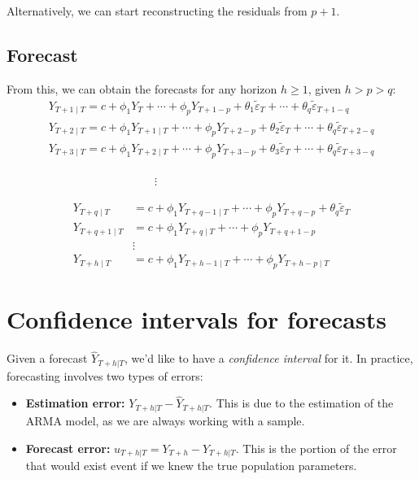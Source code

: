 \documentclass[11pt, a4paper]{report}
\theoremstyle{plain}
\theoremstyle{plain}
\theoremstyle{remark}
\begin{document}
Alternatively, we can start reconstructing the residuals from $p+1$. 

\subsection{Forecast}

From this, we can obtain the forecasts for any horizon $h \geq 1$, given $h>p>q$: 
$$\begin{array}{l}
	Y_{T+1 \mid T}=c+\phi_{1} Y_{T}+\cdots+\phi_{p} Y_{T+1-p}+\theta_{1} \widetilde{\varepsilon}_{T}+\cdots+\theta_{q} \widetilde{\varepsilon}_{T+1-q} \\
	Y_{T+2 \mid T}=c+\phi_{1} Y_{T+1 \mid T}+\cdots+\phi_{p} Y_{T+2-p}+\theta_{2} \widetilde{\varepsilon}_{T}+\cdots+\theta_{q} \widetilde{\varepsilon}_{T+2-q} \\
	Y_{T+3 \mid T}=c+\phi_{1} Y_{T+2 \mid T}+\cdots+\phi_{p} Y_{T+3-p}+\theta_{3} \widetilde{\varepsilon}_{T}+\cdots+\theta_{q} \widetilde{\varepsilon}_{T+3-q}
\end{array}$$

$ \hspace{13em} \vdots$

$$\begin{aligned}
	Y_{T+q \mid T} &=c+\phi_{1} Y_{T+q-1 \mid T}+\cdots+\phi_{p} Y_{T+q-p}+\theta_{q} \widetilde{\varepsilon}_{T} \\
	Y_{T+q+1 \mid T} &=c+\phi_{1} Y_{T+q \mid T}+\cdots+\phi_{p} Y_{T+q+1-p} \\
	& \vdots \\
	Y_{T+h \mid T} &=c+\phi_{1} Y_{T+h-1 \mid T}+\cdots+\phi_{p} Y_{T+h-p \mid T}
\end{aligned}$$

\section{Confidence intervals for forecasts}

Given a forecast $\hat{Y}_{T+h|T}$, we'd like to have a \textit{confidence interval} for it. In practice, forecasting involves two types of errors:
\begin{itemize}
	\item \textbf{Estimation error:} $Y_{T+h|T} - \hat{Y}_{T+h|T}$. This is due to the estimation of the ARMA model, as we are always working with a sample.
	\item \textbf{Forecast error:} $u_{T+h|T} = Y_{T+h} - Y_{T+h|T}$. This is the portion of the error that would exist event if we knew the true population parameters.
\end{itemize}
\end{document}
